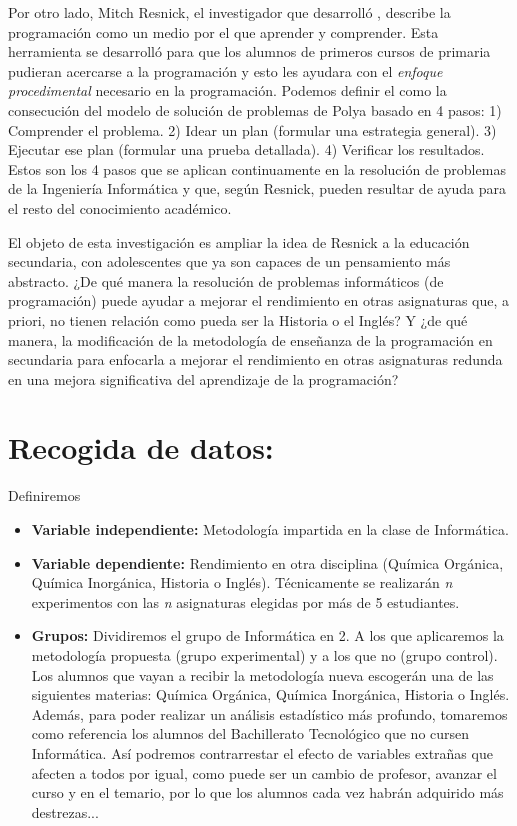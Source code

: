 \documentclass[palatino]{apuntesURJC}
\begin{document}
Por otro lado, Mitch Resnick, el investigador que desarrolló  \cite{scratch}, describe la programación como un medio por el que aprender y comprender.
%
Esta herramienta se desarrolló para que los alumnos de primeros cursos de primaria pudieran acercarse a la programación y esto les ayudara con el \textit{enfoque procedimental} necesario en la programación.
%
Podemos definir el  como la consecución del modelo de solución de problemas de Polya \cite{Polya} basado en 4 pasos:
1) Comprender el problema. 2) Idear un plan (formular una estrategia general). 3) Ejecutar ese plan (formular una prueba detallada). 4) Verificar los resultados. 
%
Estos son los 4 pasos que se aplican continuamente en la resolución de problemas de la Ingeniería Informática y que, según Resnick, pueden resultar de ayuda para el resto del conocimiento académico.

El objeto de esta investigación es ampliar la idea de Resnick a la educación secundaria, con adolescentes que ya son capaces de un pensamiento más abstracto.
%
¿De qué manera la resolución de problemas informáticos (de programación) puede ayudar a mejorar el rendimiento en otras asignaturas que, a priori, no tienen relación como pueda ser la Historia o el Inglés?
%
Y ¿de qué manera, la modificación de la metodología de enseñanza de la programación en secundaria para enfocarla a mejorar el rendimiento en otras asignaturas redunda en una mejora significativa del aprendizaje de la programación?


\section{Recogida de datos: } Definiremos 
\begin{itemize}
	\item \textbf{Variable independiente:} Metodología impartida en la clase de Informática.
	\item \textbf{Variable dependiente:} Rendimiento en otra disciplina (Química Orgánica, Química Inorgánica, Historia o Inglés).
	\subitem Técnicamente se realizarán \textit{n} experimentos con las \textit{n} asignaturas elegidas por más de 5 estudiantes.
	\item \textbf{Grupos:}
	\subitem Dividiremos el grupo de Informática en 2. A los que aplicaremos la  metodología propuesta (grupo experimental) y a los que no (grupo control).
	Los alumnos que vayan a recibir la metodología nueva escogerán una de las siguientes materias: Química Orgánica, Química Inorgánica, Historia o Inglés.
	\subitem Además, para poder realizar un análisis estadístico más profundo, tomaremos como referencia los alumnos del Bachillerato Tecnológico que no cursen Informática.
	Así podremos contrarrestar el efecto de variables extrañas que afecten a todos por igual, como puede ser un cambio de profesor, avanzar el curso y en el temario, por lo que los alumnos cada vez habrán adquirido más destrezas...
\end{itemize}
\end{document}
